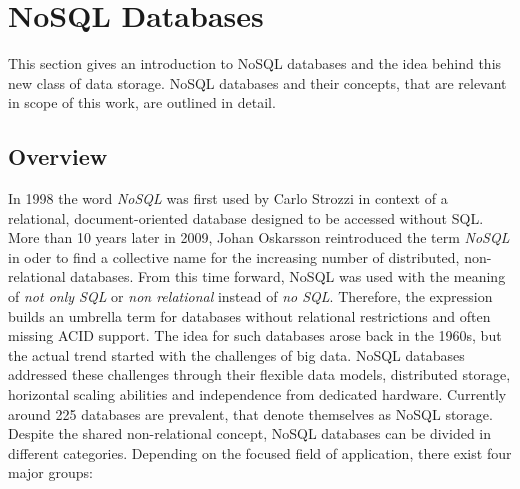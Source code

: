 \section{NoSQL Databases}
This section gives an introduction to NoSQL databases and the idea behind this new class of data storage. NoSQL databases and their concepts, that are relevant in scope of this work, are outlined in detail.

\subsection{Overview}
In 1998 the word \textit{NoSQL} was first used by Carlo Strozzi in context of a relational, document-oriented database designed to be accessed without SQL. More than 10 years later in 2009, Johan Oskarsson reintroduced the term \textit{NoSQL} in oder to find a collective name for the increasing number of distributed, non-relational databases. From this time forward, NoSQL was used with the meaning of \textit{not only SQL} or \textit{non relational} instead of \textit{no SQL}. Therefore, the expression builds an umbrella term for databases without relational restrictions and often missing ACID support. The idea for such databases arose back in the 1960s, but the actual trend started with the challenges of big data. NoSQL databases addressed these challenges through their flexible data models, distributed storage, horizontal scaling abilities and independence from dedicated hardware. Currently around 225 databases are prevalent, that denote themselves as NoSQL storage. Despite the shared non-relational concept, NoSQL databases can be divided in different categories. Depending on the focused field of application, there exist four major groups:

